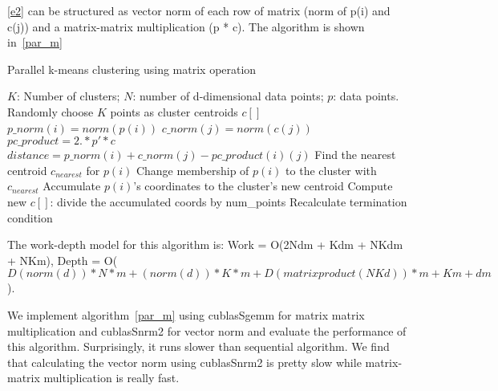 \documentclass{article}
\begin{document}
\ref{e2} can be structured as vector norm of each row of matrix (norm of p(i) and c(j)) and
a matrix-matrix multiplication (p * c). The algorithm is shown in~\ref{par_m}
\begin{algorithm}[!htp]
  \caption{Parallel k-means clustering using matrix operation} \label{par_m}
  \begin{algorithmic}[1]
    \INPUT $K$: Number of clusters; $N$: number of d-dimensional data points; $p$: data points.
     \label{alg:pm}
    \State Randomly choose $K$ points as cluster centroids $c[]$
    \State $p\_norm(i) = norm(p(i))$
    \EndFor
    \State $c\_norm(j) = norm(c(j))$
    \EndFor
    \State $pc\_product = 2 .* p' * c$
    \State $distance = p\_norm(i) + c\_norm(j) - pc\_product(i)(j)$
    \EndFor
    \State Find the nearest centroid $c_{nearest}$ for $p(i)$
    \State Change membership of $p(i)$ to the cluster with $c_{nearest}$
    \State Accumulate $p(i)$'s coordinates to the cluster's new centroid
    \EndParFor
    \State Compute new $c[]$: divide the accumulated coords by num\_points
    \State Recalculate termination condition
    \EndWhile
    \EndFunction
  \end{algorithmic}
\end{algorithm}
The work-depth model for this algorithm is: Work = O(2Ndm + Kdm + NKdm + NKm), Depth = O($D(norm(d))*N*m + (norm(d))*K*m + D(matrix product(NKd))*m + Km + dm$).

We implement algorithm~\ref{par_m} using cublasSgemm for matrix matrix multiplication and cublasSnrm2
for vector norm and evaluate the performance of this algorithm. Surprisingly, it runs slower than
sequential algorithm. We find that calculating the vector norm using cublasSnrm2 is pretty slow while
matrix-matrix multiplication is really fast.
\end{document}
